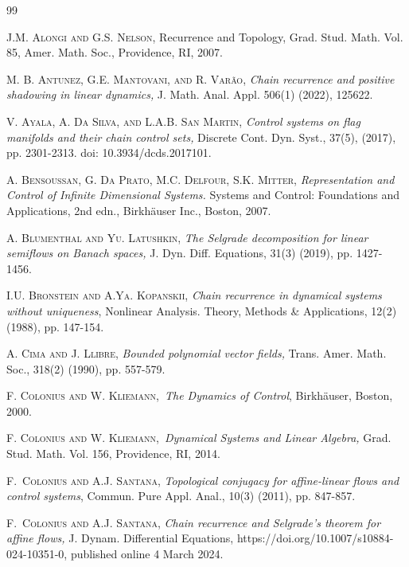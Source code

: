 \documentclass{siamltex}%
\begin{document}
\begin{thebibliography}{99}                                                                                               %


\textsc{J.M. Alongi and G.S. Nelson,} Recurrence and
Topology, Grad. Stud. Math. Vol. 85, Amer. Math. Soc., Providence, RI, 2007.

\textsc{M. B. Antunez, G.E. Mantovani, and R. Var\~{a}o,}
\emph{Chain recurrence and positive shadowing in linear dynamics, }J. Math.
Anal. Appl. 506(1) (2022), 125622.

\textsc{V. Ayala, A. Da Silva, and L.A.B. San Martin,}
\emph{Control systems on flag manifolds and their chain control sets,}
Discrete Cont. Dyn. Syst., 37(5), (2017), pp. 2301-2313. doi: 10.3934/dcds.2017101.

\textsc{A. Bensoussan, G. Da Prato, M.C. Delfour, S.K.
Mitter,} \emph{Representation and Control of Infinite Dimensional Systems.}
Systems and Control: Foundations and Applications, 2nd edn., Birkh\"{a}user
Inc., Boston, 2007.

\textsc{A. Blumenthal and Yu. Latushkin, }\emph{The Selgrade
decomposition for linear semiflows on Banach spaces,} J. Dyn. Diff. Equations,
31(3) (2019), pp. 1427-1456.

\textsc{I.U. Bronstein and A.Ya. Kopanskii, }\emph{Chain
recurrence in dynamical systems without uniqueness}, Nonlinear Analysis.
Theory, Methods \& Applications, 12(2) (1988), pp. 147-154.

\textsc{A. Cima and J. Llibre,} \emph{Bounded polynomial
vector fields,} Trans. Amer. Math. Soc., 318(2) (1990), pp. 557-579.

\textsc{F. Colonius and W. Kliemann,}\emph{\ The Dynamics of
Control}, Birkh\"{a}user, Boston, 2000.

\textsc{F. Colonius and W. Kliemann,}\emph{\ Dynamical
Systems and Linear Algebra, }Grad. Stud. Math. Vol. 156, Providence, RI, 2014.

\textsc{F.~Colonius and A.J. Santana}, \emph{Topological
conjugacy for affine-linear flows and control systems}, Commun. Pure Appl.
Anal., 10(3) (2011), pp. 847-857.

\textsc{F.~Colonius and A.J. Santana}, \emph{Chain recurrence
and Selgrade's theorem for affine flows, }J. Dynam. Differential Equations,
https://doi.org/10.1007/s10884-024-10351-0, published online 4 March 2024.


\end{thebibliography}
\end{document}
